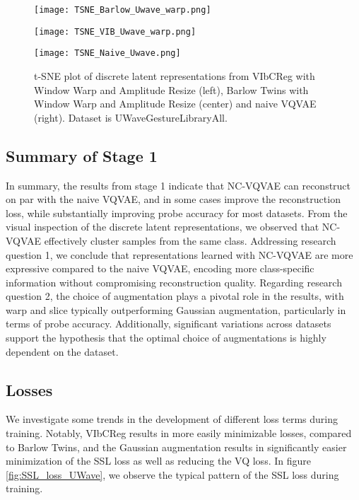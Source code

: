 \documentclass[../../thesis.tex]{subfiles}
\begin{document}
\begin{figure}[H]
    \centering
    \begin{minipage}[b]{0.32\textwidth}
        \centering
        \texttt{[image: TSNE\_Barlow\_Uwave\_warp.png]}
    \end{minipage}
    \hfill
    \begin{minipage}[b]{0.32\textwidth}
        \centering
        \texttt{[image: TSNE\_VIB\_Uwave\_warp.png]}
    \end{minipage}
    \hfill
    \begin{minipage}[b]{0.32\textwidth}
        \centering
        \texttt{[image: TSNE\_Naive\_Uwave.png]}
    \end{minipage}
    \caption{t-SNE plot of discrete latent representations from VIbCReg with Window Warp and Amplitude Resize (left), Barlow Twins with Window Warp and Amplitude Resize (center) and naive VQVAE (right). Dataset is UWaveGestureLibraryAll.}
    \label{fig:TSNE_UWave}
\end{figure}

\subsection*{Summary of Stage 1}

In summary, the results from stage 1 indicate that NC-VQVAE can reconstruct on par with the naive VQVAE, and in some cases improve the reconstruction loss, while substantially improving probe accuracy for most datasets. From the visual inspection of the discrete latent representations, we observed that NC-VQVAE effectively cluster samples from the same class. Addressing research question 1, we conclude that representations learned with NC-VQVAE are more expressive compared to the naive VQVAE, encoding more class-specific information without compromising reconstruction quality. Regarding research question 2, the choice of augmentation plays a pivotal role in the results, with warp and slice typically outperforming Gaussian augmentation, particularly in terms of probe accuracy. Additionally, significant variations across datasets support the hypothesis that the optimal choice of augmentations is highly dependent on the dataset.

\subsection{Losses}

We investigate some trends in the development of different loss terms during training. Notably, VIbCReg results in more easily minimizable losses, compared to Barlow Twins, and the Gaussian augmentation results in significantly easier minimization of the SSL loss as well as reducing the VQ loss. In figure \ref{fig:SSL_loss_UWave}, we observe the typical pattern of the SSL loss during training.
\end{document}
